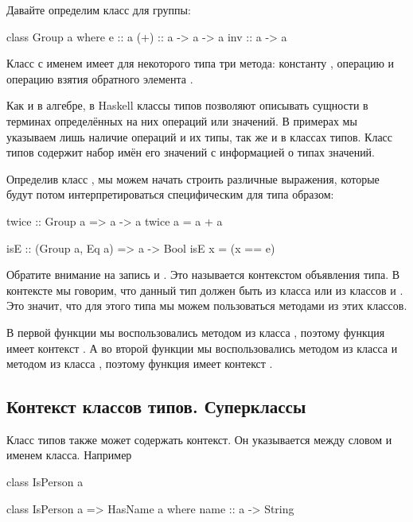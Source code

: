 Давайте определим класс для группы:

\begin{code}
class Group a where
    e   :: a
    (+) :: a -> a -> a
    inv :: a -> a
\end{code}

Класс с именем  имеет для некоторого типа  
три метода: константу , операцию 
и операцию взятия обратного элемента .

Как и в алгебре, в Haskell классы типов позволяют описывать 
сущности в терминах определённых на них операций или значений.
В примерах мы указываем лишь наличие операций и их типы, так же
и в классах типов. Класс типов содержит набор имён его значений 
с информацией о типах значений.

Определив класс , мы можем начать строить 
различные выражения, которые будут потом интерпретироваться
специфическим для типа образом:

\begin{code}
twice :: Group a => a -> a
twice a = a + a

isE :: (Group a, Eq a) => a -> Bool
isE x = (x == e)
\end{code}

Обратите внимание на запись  и 
. Это называется контекстом объявления типа. 
В контексте мы говорим, что данный тип должен быть из 
класса  или из классов  и . Это
значит, что для этого типа мы можем пользоваться методами
из этих классов.

В первой функции  мы воспользовались методом
\In{(+)} из класса , поэтому функция имеет
контекст . А во второй функции  
мы воспользовались методом  из класса  и
методом \In{(==)} из класса , поэтому функция
имеет контекст .

\subsection{Контекст классов типов. Суперклассы}

Класс типов также может содержать контекст. Он указывается
между словом  и именем класса. Например


\begin{code}
class IsPerson a

class IsPerson a => HasName a where
    name :: a -> String
\end{code}

